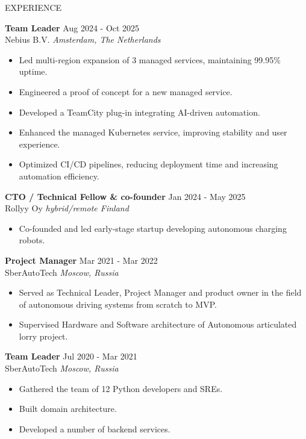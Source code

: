 \documentclass{resume} %
\begin{document}
\begin{rSection}{EXPERIENCE}

\textbf{Team Leader} \hfill Aug 2024 - Oct 2025\\
Nebius B.V. \hfill \textit{Amsterdam, The Netherlands}
\begin{itemize}
	\itemsep -3pt {}
	\item Led multi-region expansion of 3 managed services, maintaining 99.95\% uptime.
	\item Engineered a proof of concept for a new managed service.
	\item Developed a TeamCity plug-in integrating AI-driven automation.
	\item Enhanced the managed Kubernetes service, improving stability and user experience.
	\item Optimized CI/CD pipelines, reducing deployment time and increasing automation efficiency.
\end{itemize}

\textbf{CTO / Technical Fellow \& co-founder} \hfill Jan 2024 - May 2025\\
Rollyy Oy \hfill \textit{hybrid/remote Finland}
\begin{itemize}
	\item Co-founded and led early-stage startup developing autonomous charging robots.
\end{itemize}

\textbf{Project Manager} \hfill Mar 2021 - Mar 2022\\
SberAutoTech \hfill \textit{Moscow, Russia}
\begin{itemize}
   \itemsep -3pt {}
   \item Served as Technical Leader, Project Manager and product owner in the field of autonomous driving systems from scratch to MVP.
   \item Supervised Hardware and Software architecture of Autonomous articulated lorry project.

\end{itemize}

\textbf{Team Leader} \hfill Jul 2020 - Mar 2021\\
SberAutoTech \hfill \textit{Moscow, Russia}
\begin{itemize}
   \itemsep -3pt {}
   \item Gathered the team of 12 Python developers and SREs.
   \item Built domain architecture.
   \item Developed a number of backend services.
\end{itemize}


\end{rSection}
\end{document}
